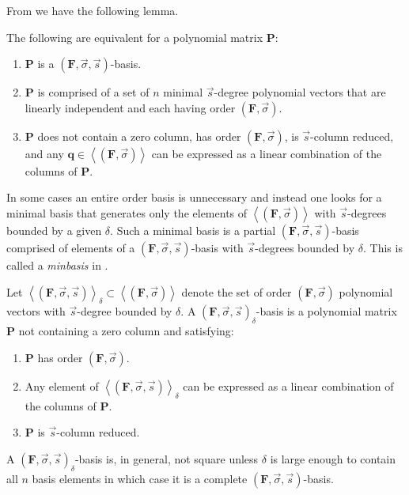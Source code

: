 From \citep{BL1997} we have the following lemma. 
\begin{lem}
\label{lem:orderBasisProperty} 

\label{lem:orderBasisEquivalence}The following are equivalent for
a polynomial matrix \textbf{$\mathbf{P}$}: 
\begin{enumerate}
\item $\mathbf{P}$ is a $\left(\mathbf{F},\vec{\sigma},\vec{s}\right)$-basis. 
\item $\mathbf{P}$ is comprised of a set of $n$ minimal $\vec{s}$-degree
polynomial vectors that are linearly independent and each having order
$\left(\mathbf{F},\vec{\sigma}\right)$. 
\item \label{enu:reduced+generator}$\mathbf{P}$ does not contain a zero
column, has order $\left(\mathbf{F},\vec{\sigma}\right)$, is $\vec{s}$-column
reduced, and any $\mathbf{q}\in\left\langle \left(\mathbf{F},\vec{\sigma}\right)\right\rangle $
can be expressed as a linear combination of the columns of $\mathbf{P}$. 
\end{enumerate}
\end{lem}
In some cases an entire order basis is unnecessary and instead one
looks for a minimal basis that generates only the elements of $\left\langle \left(\mathbf{F},\vec{\sigma}\right)\right\rangle $
with $\vec{s}$-degrees bounded by a given $\delta$. Such a minimal
basis is a partial $\left(\mathbf{F},\vec{\sigma},\vec{s}\right)$-basis
comprised of elements of a $\left(\mathbf{F},\vec{\sigma},\vec{s}\right)$-basis
with $\vec{s}$-degrees bounded by $\delta$. This is called a \emph{minbasis}
in \citet{Storjohann:2006}. 
\begin{defn}
\label{def:genset} Let $\left\langle \left(\mathbf{F},\vec{\sigma},\vec{s}\right)\right\rangle _{\delta}\subset\left\langle \left(\mathbf{F},\vec{\sigma}\right)\right\rangle $
denote the set of order $\left(\mathbf{F},\vec{\sigma}\right)$ polynomial
vectors with $\vec{s}$-degree bounded by $\delta$. A $\left(\mathbf{F},\vec{\sigma},\vec{s}\right)_{\delta}$-basis
is a polynomial matrix $\mathbf{P}$ not containing a zero column
and satisfying: 
\begin{enumerate}
\item $\mathbf{P}$ has order $\left(\mathbf{F},\vec{\sigma}\right).$ 
\item Any element of $\left\langle \left(\mathbf{F},\vec{\sigma},\vec{s}\right)\right\rangle _{\delta}$
can be expressed as a linear combination of the columns of $\mathbf{P}$. 
\item $\mathbf{P}$ is $\vec{s}$-column reduced. 
\end{enumerate}
\end{defn}
\begin{comment}
As before, the linear combination here is in fact unique. 
\end{comment}
A $\left(\mathbf{F},\vec{\sigma},\vec{s}\right)_{\delta}$-basis is,
in general, not square unless $\delta$ is large enough to contain
all $n$ basis elements in which case it is a complete $\left(\mathbf{F},\vec{\sigma},\vec{s}\right)$-basis.



